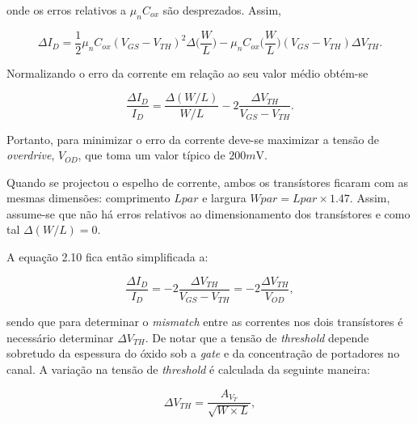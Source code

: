 \documentclass[11pt]{article}
\numberwithin{equation}{section}
\begin{document}
\vspace{1mm}
onde os erros relativos a $\mu_{n}$$C_{ox}$ são desprezados. Assim,

\vspace{-3mm}
\begin{equation}
\Delta I_{D} = \frac{1}{2}\mu_{n}C_{ox}(V_{GS}-V_{TH})^2 \Delta \Big(\frac{W}{L}\Big) - \mu_{n}C_{ox}\Big(\frac{W}{L}\Big)(V_{GS}-V_{TH})\Delta V_{TH}.
\end{equation}

\vspace{1mm}
Normalizando o erro da corrente em relação ao seu valor médio obtém-se

\vspace{-3mm}
\begin{equation}
\frac{\Delta I_{D}}{I_{D}} = \frac{\Delta({W}/{L})}{{W}/{L}} - 2 \frac{\Delta V_{TH}}{V_{GS}-V_{TH}}.
\end{equation}

\vspace{1mm}
Portanto, para minimizar o erro da corrente deve-se maximizar a tensão de \textit{overdrive}, $V_{OD}$, que toma um valor típico de $200m$V.

Quando se projectou o espelho de corrente, ambos os transístores ficaram com as mesmas dimensões: comprimento $Lpar$ e largura $Wpar = Lpar \times 1.47$. Assim, assume-se que não há erros relativos ao dimensionamento dos transístores e como tal $\Delta({W}/{L}) = 0$.

A equação 2.10 fica então simplificada a:

\vspace{-3mm}
\begin{equation}
\frac{\Delta I_{D}}{I_{D}} = - 2 \frac{\Delta V_{TH}}{V_{GS}-V_{TH}} = -2 \frac{\Delta V_{TH}}{V_{OD}},
\end{equation}

\vspace{1mm}
sendo que para determinar o \textit{mismatch} entre as correntes nos dois transístores é necessário determinar $\Delta V_{TH}$. De notar que a tensão de \textit{threshold} depende sobretudo da espessura do óxido sob a \textit{gate} e da concentração de portadores no canal. A variação na tensão de \textit{threshold} é calculada da seguinte maneira:

\vspace{-3mm}
\begin{equation}
\Delta V_{TH} = \frac{A_{V_{T}}}{\sqrt{W \times L}},
\end{equation}
\end{document}
